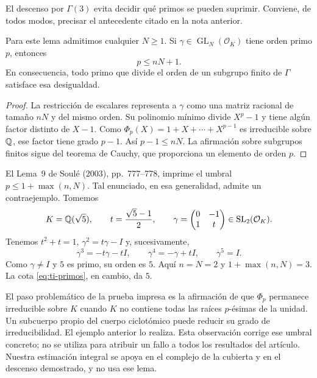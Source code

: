 El descenso por $\Gamma(3)$ evita decidir qué primos se pueden
suprimir. Conviene, de todos modos, precisar el antecedente
citado en la nota anterior.

\begin{lema}
\label{lem:ti-primos}
Para este lema admitimos cualquier $N\ge1$.
Si $\gamma\in\operatorname{GL}_N(\mathcal O_K)$ tiene orden
primo $p$, entonces
\begin{equation}
 p\le nN+1.
 \label{eq:ti-primos}
\end{equation}
En consecuencia, todo primo que divide el orden de un
subgrupo finito de $\Gamma$ satisface esa desigualdad.
\end{lema}

\begin{proof}
La restricción de escalares representa a $\gamma$ como
una matriz racional de tamaño $nN$ y del mismo orden.
Su polinomio mínimo divide $X^p-1$ y tiene algún factor
distinto de $X-1$. Como
$\Phi_p(X)=1+X+\cdots+X^{p-1}$ es irreducible sobre $\mathbb{Q}$,
ese factor tiene grado $p-1$. Así $p-1\le nN$.
La afirmación sobre subgrupos finitos sigue del teorema de
Cauchy, que proporciona un elemento de orden $p$.
\end{proof}

El Lema~9 de Soulé (2003), pp.~777--778, imprime el
umbral $p\le1+\max(n,N)$. Tal enunciado, en esa generalidad,
admite un contraejemplo. Tomemos
\begin{equation}
 K=\mathbb{Q}(\sqrt5),\qquad
 t=\frac{\sqrt5-1}{2},\qquad
 \gamma=\begin{pmatrix}0&-1\\1&t\end{pmatrix}
       \in\operatorname{SL}_2(\mathcal O_K).
 \label{eq:ti-contraejemplo}
\end{equation}
Tenemos $t^2+t=1$, $\gamma^2=t\gamma-I$ y, sucesivamente,
\[
 \gamma^3=-t\gamma-tI,\qquad
 \gamma^4=-\gamma+tI,\qquad
 \gamma^5=I.
\]
Como $\gamma\ne I$ y $5$ es primo, su orden es $5$.
Aquí $n=N=2$ y $1+\max(n,N)=3$.
La cota \eqref{eq:ti-primos}, en cambio, da $5$.

El paso problemático de la prueba impresa es la afirmación
de que $\Phi_p$ permanece irreducible sobre $K$ cuando
$K$ no contiene todas las raíces $p$-ésimas de la unidad.
Un subcuerpo propio del cuerpo ciclotómico puede reducir
su grado de irreducibilidad. El ejemplo anterior lo realiza.
Esta observación corrige ese umbral concreto; no se utiliza
para atribuir un fallo a todos los resultados del artículo.
Nuestra estimación integral se apoya en el complejo de la
cubierta y en el descenso demostrado, y no usa ese lema.

